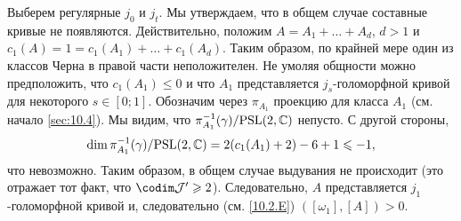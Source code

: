 Выберем регулярные $j_0$ и $j_t$.
Мы утверждаем, что в общем случае составные кривые не появляются.
Действительно, положим $A = A_1 +\dots + A_d$, $d > 1$ и $c_1 (A) = 1
= c_1 (A_1) +\dots + c_1 (A_d)$. 
Таким образом, по крайней мере один из классов Черна в правой части неположителен.
Не умоляя общности можно предположить, что $c_1 (A_1) \le 0$ и что
$A_1$ представляется $j_s$-голоморфной кривой для некоторого $s \in
[0;1]$. 
Обозначим через $\pi_{A_1}$ проекцию для класса $A_1$ (см. начало \ref{sec:10.4}).
Мы видим, что $\pi_{A_1}^{-1} (\gamma)/\mathrm{PSL}(2, \mathbb{C})$ непусто.
С другой стороны, 
\[\dim \pi_{A_1}^{-1} (\gamma)/\mathrm{PSL}(2, \mathbb{C}) = 2(c_1 (A_1) + 2) - 6 + 1 \leqslant -1,\]
что невозможно.
Таким образом, в общем случае выдувания не происходит (это отражает
тот факт, что $\codim \J' \ge 2$). 
Следовательно, $A$ представляется $j_1$-голоморфной кривой и,
следовательно (см. \ref{10.2.E}) $([\omega_1], [A]) > 0$.  
